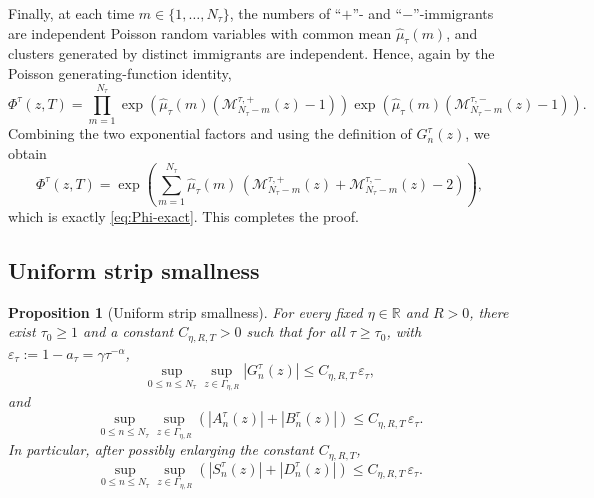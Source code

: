 \documentclass[letterpaper]{article}
\numberwithin{equation}{section}
\newtheorem{proposition}[theorem]{Proposition}
\theoremstyle{definition}
\theoremstyle{remark}
\begin{document}
Finally, at each time $m\in\{1,\dots,N_\tau\}$, the numbers of ``$+$''- and ``$-$''-immigrants are independent Poisson random variables with common mean $\hat\mu_\tau(m)$, and clusters generated by distinct immigrants are independent. Hence, again by the Poisson generating-function identity,
\[
  \Phi^\tau(z,T)
  =
  \prod_{m=1}^{N_\tau}
  \exp\!\left(
    \hat\mu_\tau(m)\left(\mathcal M_{N_\tau-m}^{\tau,+}(z)-1\right)
  \right)
  \exp\!\left(
    \hat\mu_\tau(m)\left(\mathcal M_{N_\tau-m}^{\tau,-}(z)-1\right)
  \right).
\]
Combining the two exponential factors and using the definition of $G_n^\tau(z)$, we obtain
\[
  \Phi^\tau(z,T)
  =
  \exp\!\left(
    \sum_{m=1}^{N_\tau}\hat\mu_\tau(m)\,
    \left(\mathcal M_{N_\tau-m}^{\tau,+}(z)+\mathcal M_{N_\tau-m}^{\tau,-}(z)-2\right)
  \right),
\]
which is exactly \eqref{eq:Phi-exact}. This completes the proof.


\subsection{Uniform strip smallness}\label{app:weak-euro-second-order}

\begin{proposition}[Uniform strip smallness]
\label{prop:smallness-new33}
For every fixed $\eta\in\mathbb R$ and $R>0$, there exist $\tau_0\ge1$ and a
constant $C_{\eta,R,T}>0$ such that for all $\tau\ge\tau_0$,
with $\varepsilon_\tau:=1-a_\tau=\gamma\tau^{-\alpha}$,
\begin{equation}\label{eq:G-small-new33}
  \sup_{0\le n\le N_\tau}\sup_{z\in\Gamma_{\eta,R}}
  |G_n^\tau(z)|
  \le C_{\eta,R,T}\,\varepsilon_\tau,
\end{equation}
and
\begin{equation}\label{eq:AB-small-new33}
  \sup_{0\le n\le N_\tau}\sup_{z\in\Gamma_{\eta,R}}
  \left(|A_n^\tau(z)|+|B_n^\tau(z)|\right)
  \le C_{\eta,R,T}\,\varepsilon_\tau.
\end{equation}
In particular, after possibly enlarging the constant $C_{\eta,R,T}$,
\begin{equation}\label{eq:SD-small-new33}
  \sup_{0\le n\le N_\tau}\sup_{z\in\Gamma_{\eta,R}}
  \left(|S_n^\tau(z)|+|D_n^\tau(z)|\right)
  \le C_{\eta,R,T}\,\varepsilon_\tau.
\end{equation}
\end{proposition}
\end{document}
